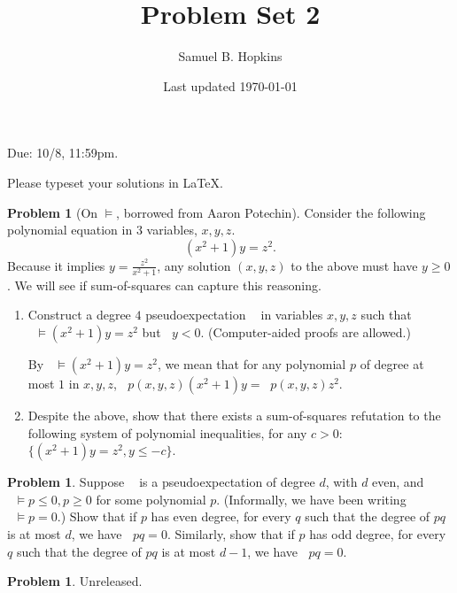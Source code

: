 \documentclass[11pt]{article}
\title{Problem Set 2}
\author{Samuel B. Hopkins}
\date{Last updated \today}
\theoremstyle{definition}
\newtheorem{problem}[theorem]{Problem}
\DeclareMathOperator{\pE}{\widetilde{\mathbb{E}}} %
\begin{document}
\maketitle

Due: 10/8, 11:59pm.

Please typeset your solutions in LaTeX.

\begin{problem}[On $\vDash$, borrowed from Aaron Potechin]

Consider the following polynomial equation in $3$ variables, $x,y,z$.
\[ (x^2 + 1) y = z^2. \]
Because it implies $y = \frac{z^2}{x^2+1}$, any solution $(x,y,z)$ to the above must have $y \ge 0$. We will see if sum-of-squares can capture this reasoning.

\begin{enumerate}
  \item Construct a degree $4$ pseudoexpectation $\pE$ in variables $x,y,z$ such that $\pE \vDash (x^2+1)y = z^2$ but $\pE y < 0$. (Computer-aided proofs are allowed.)

  By $\pE \vDash (x^2+1)y = z^2$, we mean that for any polynomial $p$ of degree at most $1$ in $x,y,z$, $\pE p(x,y,z)(x^2+1)y = \pE p(x,y,z)z^2$.

  \item Despite the above, show that there exists a sum-of-squares refutation to the following system of polynomial inequalities, for any $c > 0$: $\{ (x^2+1)y = z^2 , y \le -c \}$.
\end{enumerate}
\end{problem}

\begin{problem}
  Suppose $\pE$ is a pseudoexpectation of degree $d$, with $d$ even, and $\pE \vDash p \leq 0, p \geq 0$ for some polynomial $p$. (Informally, we have been writing $\pE \vDash p = 0$.)
  Show that if $p$ has even degree, for every $q$ such that the degree of $pq$ is at most $d$, we have $\pE pq = 0$. Similarly, show that if $p$ has odd degree, for every $q$ such that the degree of $pq$ is at most $d-1$, we have $\pE pq = 0$.
\end{problem}


\begin{problem}
  Unreleased.
\end{problem}
\end{document}
